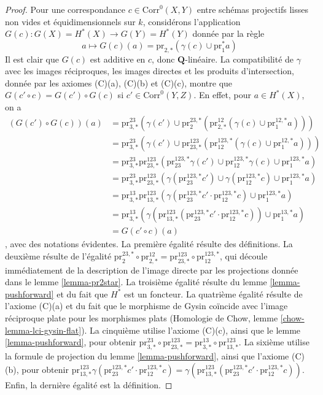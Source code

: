 \begin{proof}
\medskip\noindent
Pour une correspondance $c \in \text{Corr}^0(X, Y)$ entre
schémas projectifs lisses non vides et équidimensionnels sur $k$,
considérons l'application $G(c) : G(X) = H^*(X) \to G(Y) = H^*(Y)$
donnée par la règle
$$
a \longmapsto
G(c)(a) = \text{pr}_{2, *}(\gamma(c) \cup \text{pr}_1^*a)
$$
Il est clair que $G(c)$ est additive en $c$, donc $\mathbf{Q}$-linéaire.
La compatibilité de $\gamma$ avec les images réciproques, les images directes
et les produits d'intersection, donnée par les axiomes (C)(a), (C)(b) et (C)(c),
montre que
$G(c' \circ c) = G(c') \circ G(c)$ si $c' \in \text{Corr}^0(Y, Z)$.
En effet, pour $a \in H^*(X)$, on a
\begin{align*}
(G(c') \circ G(c))(a)
& =
\text{pr}^{23}_{3, *}(\gamma(c') \cup
\text{pr}^{23, *}_2(\text{pr}^{12}_{2, *}(\gamma(c) \cup
\text{pr}^{12, *}_1a))) \\
& =
\text{pr}^{23}_{3, *}(\gamma(c') \cup
\text{pr}^{123}_{23, *}(\text{pr}^{123, *}_{12}(\gamma(c) \cup
\text{pr}^{12, *}_1 a))) \\
& =
\text{pr}^{23}_{3, *}
\text{pr}^{123}_{23, *}(
\text{pr}^{123, *}_{23}\gamma(c') \cup
\text{pr}^{123, *}_{12}\gamma(c) \cup
\text{pr}^{123, *}_1 a) \\
& =
\text{pr}^{23}_{3, *}
\text{pr}^{123}_{23, *}(
\gamma(\text{pr}^{123, *}_{23}c') \cup
\gamma(\text{pr}^{123, *}_{12}c) \cup
\text{pr}^{123, *}_1 a) \\
& =
\text{pr}^{13}_{3, *}
\text{pr}^{123}_{13, *}(
\gamma(\text{pr}^{123, *}_{23}c' \cdot \text{pr}^{123, *}_{12}c) \cup
\text{pr}^{123, *}_1 a) \\
& =
\text{pr}^{13}_{3, *}(
\gamma(\text{pr}^{123}_{13, *}(\text{pr}^{123, *}_{23}c' \cdot
\text{pr}^{123, *}_{12}c)) \cup
\text{pr}^{13, *}_1 a) \\
& =
G(c' \circ c)(a)
\end{align*},
avec des notations évidentes. La première égalité résulte des définitions.
La deuxième résulte de l'égalité
$\text{pr}^{23, *}_2 \circ \text{pr}^{12}_{2, *} =
\text{pr}^{123}_{23, *} \circ \text{pr}^{123, *}_{12}$,
qui découle immédiatement de la description de l'image directe
par les projections donnée dans le lemme \ref{lemma-pr2star}.
La troisième égalité résulte du lemme \ref{lemma-pushforward}
et du fait que $H^*$ est un foncteur.
La quatrième égalité résulte de l'axiome (C)(a) et du fait que
le morphisme de Gysin coïncide avec l'image réciproque plate pour les morphismes plats
(Homologie de Chow, lemme \ref{chow-lemma-lci-gysin-flat}).
La cinquième utilise l'axiome (C)(c), ainsi que
le lemme \ref{lemma-pushforward}, pour obtenir
$\text{pr}^{23}_{3, *} \circ \text{pr}^{123}_{23, *} =
\text{pr}^{13}_{3, *} \circ \text{pr}^{123}_{13, *}$.
La sixième utilise la formule de projection du
lemme \ref{lemma-pushforward}, ainsi que
l'axiome (C)(b), pour obtenir $
\text{pr}^{123}_{13, *}
\gamma(\text{pr}^{123, *}_{23}c' \cdot \text{pr}^{123, *}_{12}c) =
\gamma(\text{pr}^{123}_{13, *}(
\text{pr}^{123, *}_{23}c' \cdot \text{pr}^{123, *}_{12}c))$.
Enfin, la dernière égalité est la définition.


\end{proof}
